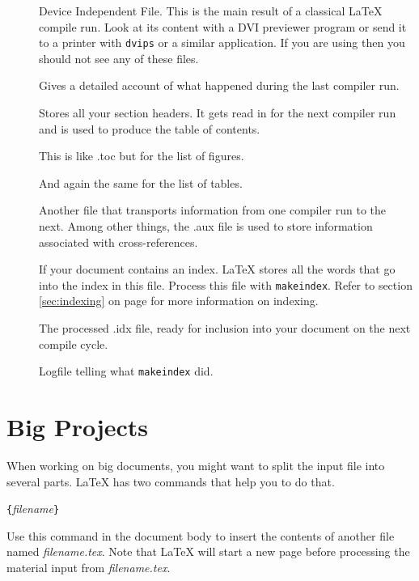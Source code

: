 \begin{description}
\item[] Device Independent File. This is the main result of a classical \LaTeX{}
  compile run. Look at its content with a DVI previewer
  program or send it to a printer with \texttt{dvips} or a
  similar application. If you are using  then you should not see any of these files.
\item[] Gives a detailed account of what happened during the
  last compiler run.
\item[] Stores all your section headers. It gets read in for the
  next compiler run and is used to produce the table of contents.
\item[] This is like .toc but for the list of figures.
\item[] And again the same for the list of tables.
\item[] Another file that transports information from one
  compiler run to the next. Among other things, the .aux file is used
  to store information associated with cross-references.
\item[] If your document contains an index. \LaTeX{} stores all
  the words that go into the index in this file. Process this file with
  \texttt{makeindex}. Refer to section \ref{sec:indexing} on
  page \pageref{sec:indexing} for more information on indexing.
\item[] The processed .idx file, ready for inclusion into your
  document on the next compile cycle.
\item[] Logfile telling what \texttt{makeindex} did.
\end{description}


%
%



%

\section{Big Projects}
When working on big documents, you might want to split the input file
into several parts. \LaTeX{} has two commands that help you to do
that.

\begin{lscommand}
\verb|{|\emph{filename}\verb|}|
\end{lscommand}
\noindent Use this command in the document body to insert the
contents of another file named \emph{filename.tex}. Note that \LaTeX{}
will start a new page
before processing the material input from \emph{filename.tex}.

